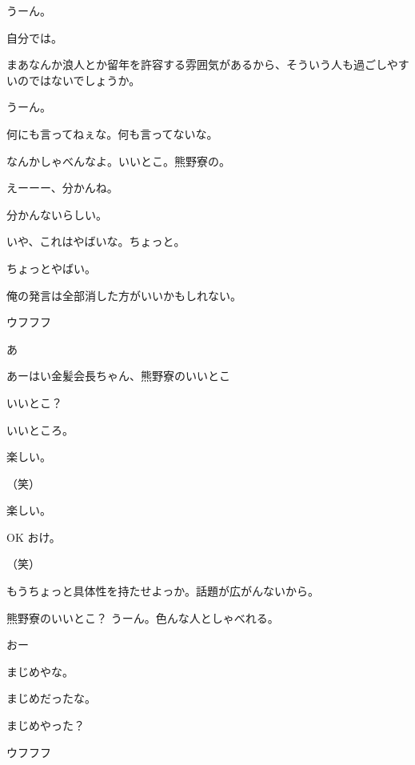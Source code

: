 \begin{multicols}{3}
{        うーん。

        自分では。

        まあなんか浪人とか留年を許容する雰囲気があるから、そういう人も過ごしやすいのではないでしょうか。

        うーん。

        何にも言ってねぇな。何も言ってないな。

        なんかしゃべんなよ。いいとこ。熊野寮の。

        えーーー、分かんね。

        分かんないらしい。

        いや、これはやばいな。ちょっと。

        ちょっとやばい。

        俺の発言は全部消した方がいいかもしれない。

        ウフフフ

    


    

        あ

        あーはい金髪会長ちゃん、熊野寮のいいとこ

        いいとこ？

        いいところ。

        楽しい。

        （笑）

        楽しい。

        OK おけ。

        （笑）

        もうちょっと具体性を持たせよっか。話題が広がんないから。

        熊野寮のいいとこ？ うーん。色んな人としゃべれる。

        おー

        まじめやな。

        まじめだったな。

        まじめやった？

        ウフフフ

}
\end{multicols}
